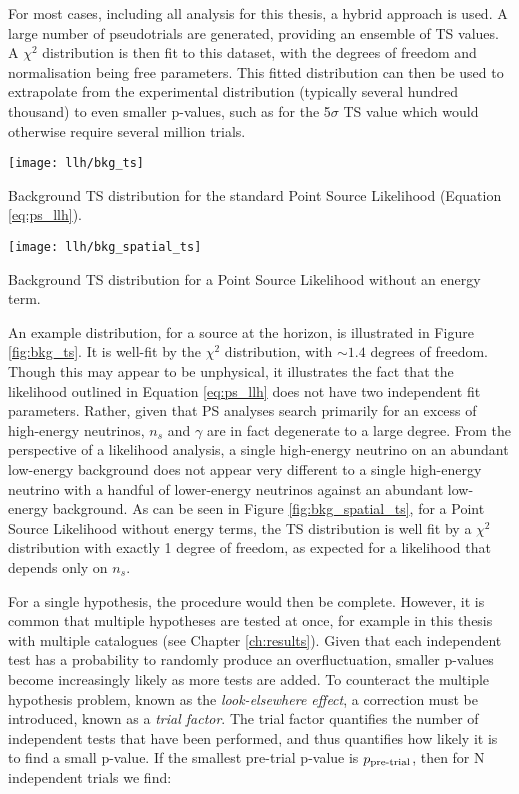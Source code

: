For most cases, including all analysis for this thesis, a hybrid approach is used. A large number of pseudotrials are generated, providing an ensemble of TS values. A $\chi^{2}$ distribution is then fit to this dataset, with the degrees of freedom and normalisation being free parameters. This fitted distribution can then be used to extrapolate from the experimental distribution (typically several hundred thousand) to even smaller p-values, such as for the 5$\sigma$ TS value which would otherwise require several million trials.

\begin{marginfigure}
	\centering \texttt{[image: llh/bkg\_ts]}
	\caption{Background TS distribution for the standard Point Source Likelihood (Equation \ref{eq:ps_llh}).}
	\label{fig:bkg_ts}
\end{marginfigure}

\begin{marginfigure}
	\centering \texttt{[image: llh/bkg\_spatial\_ts]}
	\caption{Background TS distribution for a Point Source Likelihood without an energy term.}
	\label{fig:bkg_spatial_ts}
\end{marginfigure}

An example distribution, for a source at the horizon, is illustrated in Figure \ref{fig:bkg_ts}. It is well-fit by the $\chi^{2}$ distribution, with $\sim1.4$ degrees of freedom. Though this may appear to be unphysical, it illustrates the fact that the likelihood outlined in Equation \ref{eq:ps_llh} does not have two independent fit parameters. Rather, given that PS analyses search primarily for an excess of high-energy neutrinos, $n_{s}$ and $\gamma$ are in fact degenerate to a large degree. From the perspective of a likelihood analysis, a single high-energy neutrino on an abundant low-energy background does not appear very different to a single high-energy neutrino with a handful of lower-energy neutrinos against an abundant low-energy background. As can be seen in Figure \ref{fig:bkg_spatial_ts}, for a Point Source Likelihood without energy terms, the TS distribution is well fit by a $\chi^{2}$ distribution with exactly 1 degree of freedom, as expected for a likelihood that depends only on $n_{s}$.

For a single hypothesis, the procedure would then be complete. However, it is common that multiple hypotheses are tested at once, for example in this thesis with multiple catalogues (see Chapter \ref{ch:results}). Given that each independent test has a probability to randomly produce an overfluctuation, smaller p-values become increasingly likely as more tests are added. To counteract the multiple hypothesis problem, known as the \emph{look-elsewhere effect}, a correction must be introduced, known as a \emph{trial factor}. The trial factor quantifies the number of independent tests that have been performed, and thus quantifies how likely it is to find a small p-value. If the smallest pre-trial p-value is $p_{\textup{pre-trial}} $, then for N independent trials we find:

